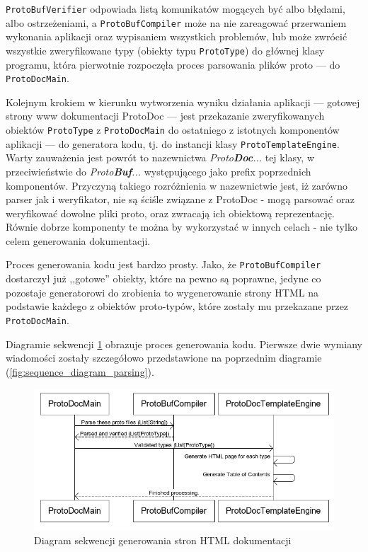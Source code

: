 \documentclass[pdflatex,11pt]{aghdpl}
\begin{document}
\verb|ProtoBufVerifier| odpowiada listą komunikatów mogących być albo błędami, albo ostrzeżeniami, a \verb|ProtoBufCompiler| może na nie zareagować przerwaniem
wykonania aplikacji oraz wypisaniem wszystkich problemów, lub może zwrócić wszystkie zweryfikowane typy (obiekty typu \verb|ProtoType|) do głównej klasy programu,
która pierwotnie rozpoczęła proces parsowania plików proto --- do \verb|ProtoDocMain|.

Kolejnym krokiem w kierunku wytworzenia wyniku działania aplikacji --- gotowej strony www dokumentacji ProtoDoc --- jest 
przekazanie zweryfikowanych obiektów \verb|ProtoType| z \verb|ProtoDocMain| do ostatniego z istotnych komponentów aplikacji --- do generatora kodu, tj. 
do instancji klasy \verb|ProtoTemplateEngine|. Warty zauważenia jest powrót to nazewnictwa \textit{Proto\textbf{Doc}...} tej klasy, w przeciwieństwie do \textit{Proto\textbf{Buf}...}
występującego jako prefix poprzednich komponentów. Przyczyną takiego rozróżnienia w nazewnictwie jest, iż zarówno parser jak i weryfikator, nie są ściśle związane
z ProtoDoc - mogą parsować oraz weryfikować dowolne pliki proto, oraz zwracają ich obiektową reprezentację. Równie dobrze komponenty te można by wykorzystać
w innych celach - nie tylko celem generowania dokumentacji. 

Proces generowania kodu jest bardzo prosty. Jako, że \verb|ProtoBufCompiler| dostarczył już ,,gotowe'' obiekty, które na pewno są poprawne, jedyne co pozostaje
generatorowi do zrobienia to wygenerowanie strony HTML na podstawie każdego z obiektów proto-typów, które zostały mu przekazane przez \verb|ProtoDocMain|.

Diagramie sekwencji \ref{fig:generate_html_seq} obrazuje proces generowania kodu. Pierwsze dwie wymiany wiadomości zostały szczegółowo 
przedstawione na poprzednim diagramie (\ref{fig:sequence_diagram_parsing}).

\begin{figure}[ch]
\begin{center}
 \includegraphics[scale=0.75]{generate_html_seq}
\end{center}
\caption{Diagram sekwencji generowania stron HTML dokumentacji}
\label{fig:generate_html_seq}
\end{figure}
\end{document}
